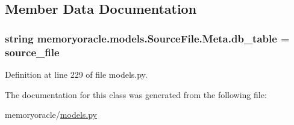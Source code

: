 \subsection{Member Data Documentation}
\hypertarget{classmemoryoracle_1_1models_1_1SourceFile_1_1Meta_a639d7e9516dab6a2f571baf647404617}{}
\subsubsection[{db\+\_\+table}]{\setlength{\rightskip}{0pt plus 5cm}string memoryoracle.\+models.\+Source\+File.\+Meta.\+db\+\_\+table = \textquotesingle{}source\+\_\+file\textquotesingle{}\hspace{0.3cm}{\ttfamily [static]}}\label{classmemoryoracle_1_1models_1_1SourceFile_1_1Meta_a639d7e9516dab6a2f571baf647404617}


Definition at line 229 of file models.\+py.



The documentation for this class was generated from the following file\+:\begin{DoxyCompactItemize}
\item 
memoryoracle/\hyperlink{models_8py}{models.\+py}\end{DoxyCompactItemize}
